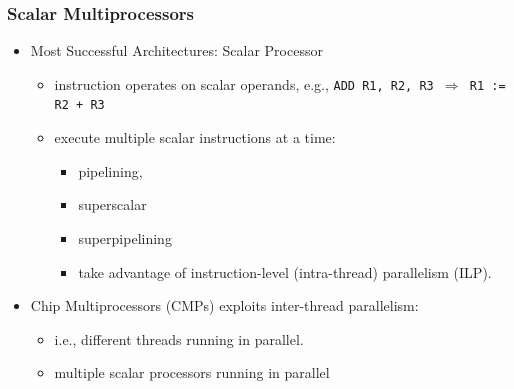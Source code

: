 \documentclass{beamer}
\begin{document}
\begin{frame}[fragile,t]
\frametitle{Scalar Multiprocessors}

\begin{itemize}
            \item Most Successful Architectures: Scalar Processor
                \begin{itemize}
                    \item instruction operates on scalar operands, 
                            e.g., {\tt ADD R1, R2, R3 $\Rightarrow$ R1 := R2 + R3}
                    \item execute multiple scalar instructions at a time:
                    \begin{itemize}
                        \item pipelining, 
                        \item superscalar
                        \item superpipelining
                        \item take advantage of instruction-level (intra-thread) 
                                parallelism (ILP).
                    \end  {itemize}
                \end  {itemize}

            \item Chip Multiprocessors (CMPs) exploits inter-thread parallelism:
                    \begin{itemize}
                        \item i.e., different threads running in parallel. 
                        \item multiple scalar processors running in parallel
                    \end  {itemize}
\end  {itemize}

\end{frame}
\end{document}
